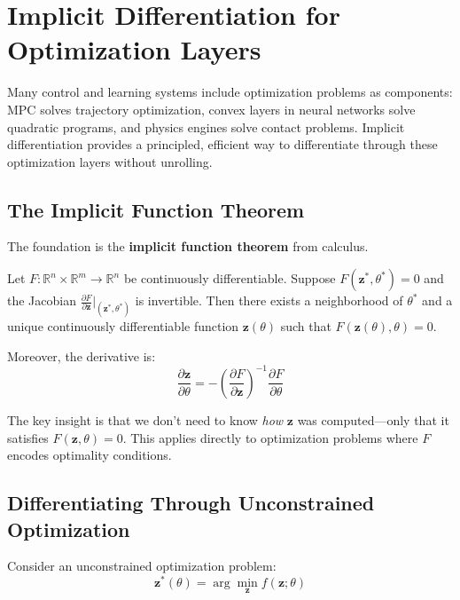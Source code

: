 \section{Implicit Differentiation for Optimization Layers}
\label{sec:implicit_diff}

Many control and learning systems include optimization problems as components: MPC solves trajectory optimization, convex layers in neural networks solve quadratic programs, and physics engines solve contact problems. Implicit differentiation provides a principled, efficient way to differentiate through these optimization layers without unrolling.

\subsection{The Implicit Function Theorem}

The foundation is the \textbf{implicit function theorem} from calculus.

\begin{theorem}
Let $F: \mathbb{R}^n \times \mathbb{R}^m \to \mathbb{R}^n$ be continuously differentiable. Suppose $F(\mathbf{z}^*, \theta^*) = 0$ and the Jacobian $\frac{\partial F}{\partial \mathbf{z}}|_{(\mathbf{z}^*, \theta^*)}$ is invertible. Then there exists a neighborhood of $\theta^*$ and a unique continuously differentiable function $\mathbf{z}(\theta)$ such that $F(\mathbf{z}(\theta), \theta) = 0$.

Moreover, the derivative is:
\begin{equation}
\frac{\partial \mathbf{z}}{\partial \theta} = -\left( \frac{\partial F}{\partial \mathbf{z}} \right)^{-1} \frac{\partial F}{\partial \theta}
\label{eq:ift}
\end{equation}
\end{theorem}

The key insight is that we don't need to know \textit{how} $\mathbf{z}$ was computed---only that it satisfies $F(\mathbf{z}, \theta) = 0$. This applies directly to optimization problems where $F$ encodes optimality conditions.

\subsection{Differentiating Through Unconstrained Optimization}

Consider an unconstrained optimization problem:
\begin{equation}
\mathbf{z}^*(\theta) = \arg\min_{\mathbf{z}} f(\mathbf{z}; \theta)
\end{equation}


